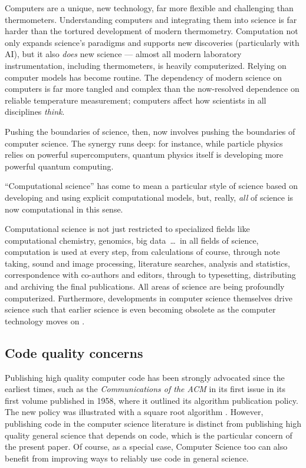 \documentclass{comjnl}
\begin{document}
Computers are a unique, new technology, far more flexible and challenging than thermometers. Understanding computers and integrating them into science is far harder than the tortured development of modern thermometry. Computation not only expands science's paradigms and supports new discoveries (particularly with AI), but it also \emph{does\/} new science --- almost all modern laboratory instrumentation, including thermometers, is heavily computerized. Relying on computer models has become routine. The dependency of modern science on computers is far more tangled and complex than the now-resolved dependence on reliable temperature measurement; computers affect how scientists in all disciplines \emph{think}.

Pushing the boundaries of science, then, now involves pushing the boundaries of computer science. The synergy runs deep: for instance, while particle physics relies on powerful supercomputers, quantum physics itself is developing more powerful quantum computing.

``Computational science'' has come to mean a particular style of science based on developing and using explicit computational models, but, really, \emph{all\/} of science is now computational in this sense. 

Computational science is not just restricted to specialized fields like computational chemistry, genomics, big data~\ldots\ in all fields of science, computation is used at every step, from calculations of course, through note taking, sound and image processing, literature searches, analysis and statistics, correspondence with co-authors and editors, through to typesetting,  distributing and archiving the final publications. All areas of science are being profoundly computerized. Furthermore, developments in computer science themselves drive science such that earlier science is even becoming obsolete as the computer technology moves on \cite{form}.

\subsection{Code quality concerns}\label{related-work}
Publishing high quality computer code has been strongly advocated since the earliest times, such as the \emph{Communications of the ACM\/} in its first issue in its first volume published in 1958, where it outlined its algorithm publication policy. The new policy was illustrated with a square root algorithm \cite{acm-algorithms}. However, publishing code in the computer science literature is distinct from publishing high quality general science that depends on code, which is the particular concern of the present paper. Of course, as a special case, Computer Science too can also benefit from improving ways to reliably use code in general science.
\end{document}
